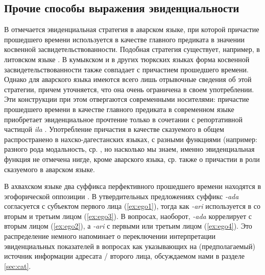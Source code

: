 \subsection{Прочие способы выражения эвиденциальности} \label{sec:otherevid}
\color{black}
В \citep[196--197]{forker2018evidavar} отмечается эвиденциальная стратегия в аварском языке, при которой причастие прошедшего времени используется в качестве главного предиката в значении косвенной засвидетельствованности. Подобная стратегия существует, например, в литовском языке \citep{walchli2000}. В кумыкском и в других тюркских языках форма косвенной засвидетельствованности также совпадает с причастием прошедшего времени. Однако для аварского языка имеются всего лишь отрывочные сведения об этой стратегии, причем уточняется, что она очень ограничена в своем употреблении. Эти конструкции при этом отвергаются современными носителями: причастие прошедшего времени в качестве главного предиката в современном языке приобретает эвиденциальное прочтение только в сочетании с репортативной частицой \textit{ila} \citep[196--197]{forker2018evidavar}. Употребление причастия в качестве сказуемого в общем распространено в нахско-дагестанских языках, с разными функциями (например: разного рода модальность, ср. \citep{Kalinina2003}, но насколько мы знаем, именно эвиденциальная функция не отмечена нигде, кроме аварского языка, ср. также \citep[69--80]{bokarev1949avar} о причастии в роли сказуемого в аварском языке.
\par В ахвахском языке два суффикса перфективного прошедшего времени находятся в эгофорической оппозиции \citep{creissels2009}. В утвердительных предложениях суффикс \textit{-ada} \color{purple}согласуется с субъектом первого лица (\ref{ex:ego1}), тогда как \textit{-ari} используется в со вторым и третьим лицом (\ref{ex:ego3}). В вопросах, наоборот, \textit{-ada} коррелирует с вторым лицом (\ref{ex:ego2}), а \textit{-ari} с первыми или третьим лицом (\ref{ex:ego4}). Это распределение немного напоминает о переключении интерпретации эвиденциальных показателей в вопросах как указывающих на (предполагаемый) источник информации адресата / второго лица, обсуждаемом нами в разделе \ref{sec:cat}.


